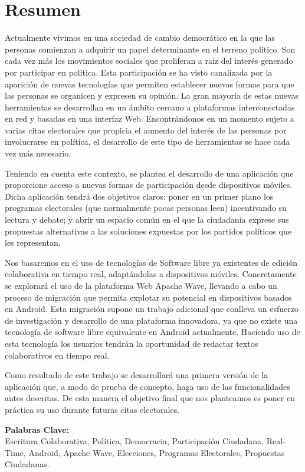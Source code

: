\newpage
\renewcommand{\thepage}{\Roman{page}}
\setcounter{page}{10}
\chapter*{Resumen}
Actualmente vivimos en una sociedad de cambio democrático en la que las personas comienzan a adquirir un papel determinante en el terreno político. Son cada vez más los movimientos sociales que proliferan a raíz del interés generado por participar en politica. Esta participación se ha visto canalizada por la aparición de nuevas tecnologías que permiten establecer nuevas formas para que las personas se organicen y expresen su opinión. La gran mayoría de estas nuevas herramientas se desarrollan en un ámbito cercano a plataformas interconectadas en red y basadas en una interfaz Web. Encontrándonos en un momento sujeto a varias citas electorales que propicia el aumento del interés de las personas por involucrarse en política, el desarrollo de este tipo de herramientas se hace cada vez más necesario.

Teniendo en cuenta este contexto, se plantea el desarrollo de una aplicación que proporcione acceso a nuevas formas de participación desde dispositivos móviles. Dicha aplicación tendrá dos objetivos claros: poner en un primer plano los programas electorales (que normalmente pocas personas leen) incentivando su lectura y debate; y abrir un espacio común en el que la ciudadanía exprese sus propuestas alternativas a las soluciones expuestas por los partidos políticos que les representan.

Nos basaremos en el uso de tecnologías de Software libre ya existentes de edición colaborativa en tiempo real, adaptándolas a dispositivos móviles. Concretamente se explorará el uso de la plataforma Web Apache Wave, llevando a cabo un proceso de migración que permita explotar su potencial en dispositivos basados en Android. Esta migración supone un trabajo adicional que conlleva un esfuerzo de investigación y desarrollo de una plataforma innovadora, ya que no existe una tecnología de software libre equivalente en Android actualmente. Haciendo uso de esta tecnología los usuarios tendrán la oportunidad de redactar textos colaborativos en tiempo real.

Como resultado de este trabajo se desarrollará una primera versión de la aplicación que, a modo de prueba de concepto, haga uso de las funcionalidades antes descritas. De esta manera el objetivo final que nos planteamos es poner en práctica su uso durante futuras citas electorales.

\vfill
{\bf Palabras Clave:}\\
{Escritura Colaborativa, Política, Democracia, Participación Ciudadana, Real-Time, Android, Apache Wave, Elecciones, Programas Electorales, Propuestas Ciudadanas.}

\newpage
\thispagestyle{empty}
\mbox{}

